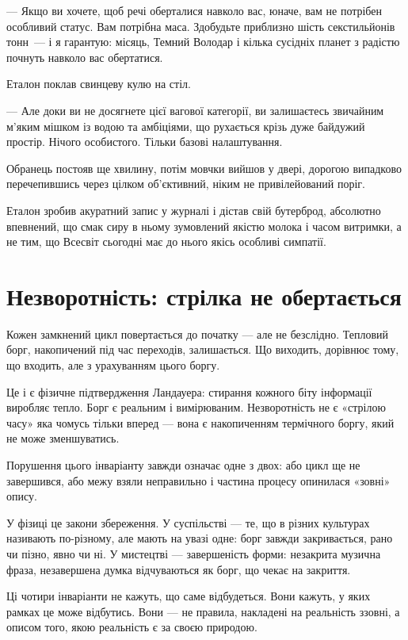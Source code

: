 \documentclass[12pt, a4paper, openany]{book}
\begin{document}
\begin{terrybox}
--- Якщо ви хочете, щоб речі оберталися навколо вас, юначе, вам не потрібен особливий статус. Вам потрібна маса. Здобудьте приблизно шість секстильйонів тонн~--- і я гарантую: місяць, Темний Володар і кілька сусідніх планет з радістю почнуть навколо вас обертатися.

Еталон поклав свинцеву кулю на стіл.

--- Але доки ви не досягнете цієї вагової категорії, ви залишаєтесь звичайним м'яким мішком із водою та амбіціями, що рухається крізь дуже байдужий простір. Нічого особистого. Тільки базові налаштування.

\medskip
Обранець постояв ще хвилину, потім мовчки вийшов у двері, дорогою випадково перечепившись через цілком об'єктивний, ніким не привілейований поріг.

Еталон зробив акуратний запис у журналі і дістав свій бутерброд, абсолютно впевнений, що смак сиру в ньому зумовлений якістю молока і часом витримки, а не тим, що Всесвіт сьогодні має до нього якісь особливі симпатії.
\end{terrybox}

\section{Незворотність: стрілка не обертається}

Кожен замкнений цикл повертається до початку --- але не безслідно. Тепловий борг, накопичений під час переходів, залишається. Що виходить, дорівнює тому, що входить, але з урахуванням цього боргу.

Це і є фізичне підтвердження Ландауера: стирання кожного біту інформації виробляє тепло. Борг є реальним і вимірюваним. Незворотність не є «стрілою часу» яка чомусь тільки вперед --- вона є накопиченням термічного боргу, який не може зменшуватись.

Порушення цього інваріанту завжди означає одне з двох: або цикл ще не завершився, або межу взяли неправильно і частина процесу опинилася «зовні» опису.

У фізиці це закони збереження. У суспільстві --- те, що в різних культурах називають по-різному, але мають на увазі одне: борг завжди закривається, рано чи пізно, явно чи ні. У мистецтві --- завершеність форми: незакрита музична фраза, незавершена думка відчуваються як борг, що чекає на закриття.

Ці чотири інваріанти не кажуть, що саме відбудеться. Вони кажуть, у яких рамках це може відбутись. Вони — не правила, накладені на реальність ззовні, а описом того, якою реальність є за своєю природою.
\end{document}
